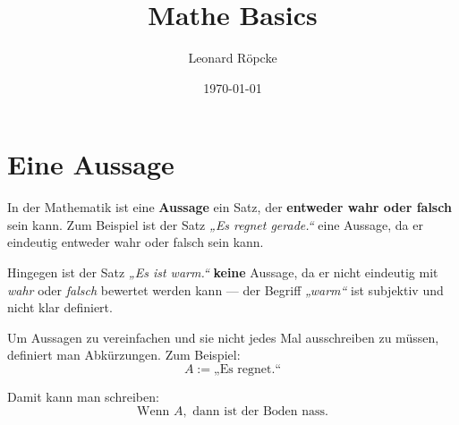 \documentclass[12pt,a4paper]{article}
\title{Mathe Basics}
\author{Leonard Röpcke}
\date{\today}
\begin{document}
\maketitle
\tableofcontents
\newpage

\section{Eine Aussage}

In der Mathematik ist eine \textbf{Aussage} ein Satz, der \textbf{entweder wahr oder falsch} sein kann. 
Zum Beispiel ist der Satz 
\textit{„Es regnet gerade.“} 
eine Aussage, da er eindeutig entweder wahr oder falsch sein kann.

Hingegen ist der Satz 
\textit{„Es ist warm.“} 
\textbf{keine} Aussage, da er nicht eindeutig mit \textit{wahr} oder \textit{falsch} bewertet werden kann — 
der Begriff \textit{„warm“} ist subjektiv und nicht klar definiert.

Um Aussagen zu vereinfachen und sie nicht jedes Mal ausschreiben zu müssen, 
definiert man Abkürzungen. Zum Beispiel:
\[
A := \text{„Es regnet.“}
\]

Damit kann man schreiben:
\[
\text{Wenn } A, \text{ dann ist der Boden nass.}
\]
\end{document}
